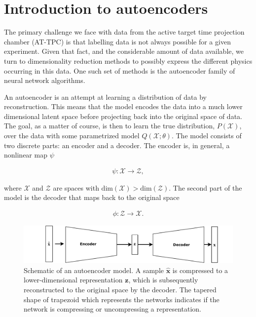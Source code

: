 

\section{Introduction to autoencoders}\label{sec:intro_autoenc}

The primary challenge we face with data from the active target time projection chamber (AT-TPC) is that labelling data is not always possible for a given experiment. Given that fact, and the considerable amount of data available, we turn to dimensionality reduction methods to possibly express the different physics occurring in this data. One such set of methods is the autoencoder family of neural network algorithms.

An autoencoder is an attempt at learning a distribution of data by reconstruction. This means that the model encodes the data into a much lower dimensional latent space before projecting back into the original space of data. The goal, as a matter of course, is then to learn the true distribution, $P(\mathcal{X})$, over the data with some parametrized model $Q(\mathcal{X};\theta)$. The model consists of two discrete parts: an encoder and a decoder. The encoder is, in general, a nonlinear map $\psi$

\begin{align}
  \psi: \mathcal{X} \rightarrow \mathcal{Z},
\end{align}

\noindent where $\mathcal{X} $ and $\mathcal{Z}$ are spaces with $\text{dim}(\mathcal{X}) > \text{dim}(\mathcal{Z})$.
The second part of the model is the decoder that maps back to the original space


\begin{align}
  \phi: \mathcal{Z} \rightarrow \mathcal{X}.
\end{align}

\begin{figure}[tb]
	\centering
	\includegraphics[width=\textwidth]{plots/autoencoder.pdf}
	\caption[Autoencoder schematic]{Schematic of an autoencoder model. A sample $\hat{\mathbf{x}}$ is compressed to a lower-dimensional representation $\mathbf{z}$, which is subsequently reconstructed to the original space by the decoder. The tapered shape of trapezoid which represents the networks indicates if the network is compressing or uncompressing a representation.}
	\label{fig:autoencoder}
\end{figure}

